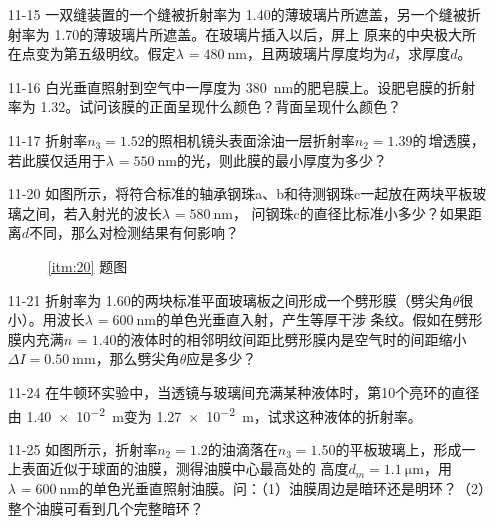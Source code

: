 \documentclass[UTF-8]{ctexart}
\makeatletter
\newcommand{\mlabel}[2]{#2\def\@currentlabel{#2}\label{#1}}
\newcommand{\csi}[2]{ \SI{#1}{#2}}
\newcommand{\lbd}[3]{\(\lambda_{#3}=\csi{#1}{#2}\)}
\newcommand{\ri}[2]{\(n_{#2}={#1}\)}
\makeatother
\begin{document}
\begin{enumerate}
\begin{figure}[htb]
\begin{minipage}[b]{0.4\textwidth}
            \end{minipage}
        \end{figure}
    \item[11-15] 一双缝装置的一个缝被折射率为\csi{1.40}{}的薄玻璃片所遮盖，另一个缝被折射率为\csi{1.70}{}的薄玻璃片所遮盖。在玻璃片插入以后，屏上
        原来的中央极大所在点变为第五级明纹。假定\lbd{480}{\nm}{}，且两玻璃片厚度均为\(d\)，求厚度\(d\)。
    \item[11-16] 白光垂直照射到空气中一厚度为\csi{380}{\nm}的肥皂膜上。设肥皂膜的折射率为\csi{1.32}{}。试问该膜的正面呈现什么颜色？背面呈现什么颜色？
    \item[11-17] 折射率\ri{1.52}{3}的照相机镜头表面涂油一层折射率\ri{1.39}{2}的\,增透膜，若此膜仅适用于\lbd{550}{\nm}{}的光，则此膜的最小厚度为多少？
    \item[\mlabel{itm:20}{11-20}] 如图所示，将符合标准的轴承钢珠a、b和待测钢珠c一起放在两块平板玻璃之间，若入射光的波长\lbd{580}{\nm}{}，
        问钢珠c的直径比标准小多少？如果距离\(d\)不同，那么对检测结果有何影响？
        \begin{figure}[htb]
            \centering
            \begin{minipage}[b]{0.4\textwidth}
                \centering
                \caption{\ref{itm:20} 题图}
            \end{minipage}
        \end{figure}
    \item[11-21] 折射率为\csi{1.60}{}的两块标准平面玻璃板之间形成一个劈形膜（劈尖角\(\theta\)很小）。用波长\lbd{600}{\nm}{}的单色光垂直入射，产生等厚干涉
        条纹。假如在劈形膜内充满\ri{1.40}{}的液体时的相邻明纹间距比劈形膜内是空气时的间距缩小\(\Delta I=\csi{0.50}{\mm}\)，那么劈尖角\(\theta\)应是多少？
    \item[11-24] 在牛顿环实验中，当透镜与玻璃间充满某种液体时，第10个亮环的直径由\csi{1.40e-2}{\m}变为\csi{1.27e-2}{\m}，试求这种液体的折射率。
    \item[\mlabel{itm:25}{11-25}] 如图所示，折射率\ri{1.2}{2}的油滴落在\ri{1.50}{3}的平板玻璃上，形成一上表面近似于球面的油膜，测得油膜中心最高处的
        高度\(d_m=\csi{1.1}{\um}\)，用\lbd{600}{\nm}{}的单色光垂直照射油膜。问：（1）油膜周边是暗环还是明环？（2）整个油膜可看到几个完整暗环？
        


\end{enumerate}
\end{document}
